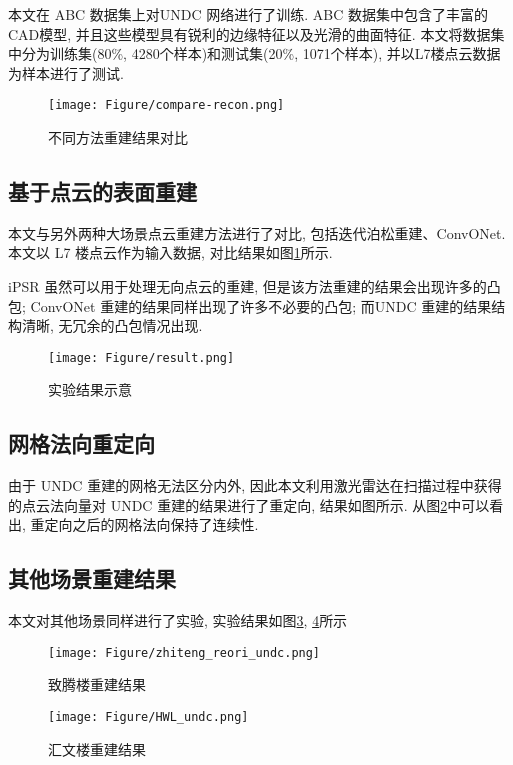 本文在 ABC 数据集上对UNDC 网络进行了训练. ABC 数据集中包含了丰富的CAD模型, 并且这些模型具有锐利的边缘特征以及光滑的曲面特征. 
本文将数据集中分为训练集(80\%, 4280个样本)和测试集(20\%, 1071个样本), 并以L7楼点云数据为样本进行了测试. 

\begin{figure}[H]
	\center
	\texttt{[image: Figure/compare-recon.png]}
	\centering
	\caption{不同方法重建结果对比}\label{fig:fig-compare}
\end{figure}

\subsection{基于点云的表面重建}
本文与另外两种大场景点云重建方法进行了对比, 包括迭代泊松重建\cite{hou2022iterative}、ConvONet\cite{tang2021sa}. 本文以 L7 楼点云作为输入数据, 对比结果如图\ref{fig:fig-compare}所示. 

iPSR 虽然可以用于处理无向点云的重建, 但是该方法重建的结果会出现许多的凸包; ConvONet 重建的结果同样出现了许多不必要的凸包; 而UNDC 重建的结果结构清晰, 无冗余的凸包情况出现. 

\begin{figure}[H]
	\center
	\texttt{[image: Figure/result.png]}
	\centering
	\caption{实验结果示意}\label{fig:fig-result}
\end{figure}

\subsection{网格法向重定向} \label{reorientation}
由于 UNDC 重建的网格无法区分内外, 因此本文利用激光雷达在扫描过程中获得的点云法向量对 UNDC 重建的结果进行了重定向, 结果如图所示. 从图\ref{fig:fig-result}中可以看出, 重定向之后的网格法向保持了连续性. 

\subsection{其他场景重建结果}

本文对其他场景同样进行了实验, 实验结果如图\ref{fig:fig-zhiteng}, \ref{fig:fig-hwl}所示
\begin{figure}[H]
	\center
	\texttt{[image: Figure/zhiteng\_reori\_undc.png]}
	\centering
	\caption{致腾楼重建结果}\label{fig:fig-zhiteng}
\end{figure}

\begin{figure}[H]
	\center
	\texttt{[image: Figure/HWL\_undc.png]}
	\centering
	\caption{汇文楼重建结果}\label{fig:fig-hwl}
\end{figure}


